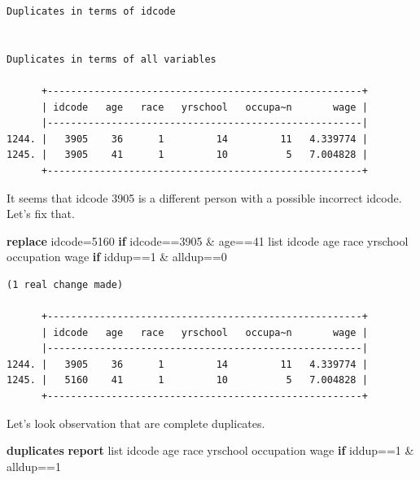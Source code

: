 \documentclass[
]{book}
\newenvironment{Shaded}{\begin{snugshade}}{\end{snugshade}}
\newcommand{\KeywordTok}[1]{\textcolor[rgb]{0.13,0.29,0.53}{\textbf{#1}}}
\newcommand{\NormalTok}[1]{#1}
\newcommand{\OtherTok}[1]{\textcolor[rgb]{0.56,0.35,0.01}{#1}}
\begin{document}
\begin{verbatim}
Duplicates in terms of idcode


Duplicates in terms of all variables

      +------------------------------------------------------+
      | idcode   age   race   yrschool   occupa~n       wage |
      |------------------------------------------------------|
1244. |   3905    36      1         14         11   4.339774 |
1245. |   3905    41      1         10          5   7.004828 |
      +------------------------------------------------------+
\end{verbatim}

It seems that idcode 3905 is a different person with a possible incorrect idcode. Let's fix that.

\begin{Shaded}
\begin{Highlighting}[]
\KeywordTok{replace}\NormalTok{ idcode=5160 }\KeywordTok{if}\NormalTok{ idcode==3905 \& age==41}
\OtherTok{list}\NormalTok{ idcode age race yrschool occupation wage }\KeywordTok{if}\NormalTok{ iddup==1 \& alldup==0}
\end{Highlighting}
\end{Shaded}

\begin{verbatim}
(1 real change made)

      +------------------------------------------------------+
      | idcode   age   race   yrschool   occupa~n       wage |
      |------------------------------------------------------|
1244. |   3905    36      1         14         11   4.339774 |
1245. |   5160    41      1         10          5   7.004828 |
      +------------------------------------------------------+
\end{verbatim}

Let's look observation that are complete duplicates.

\begin{Shaded}
\begin{Highlighting}[]
\KeywordTok{duplicates} \KeywordTok{report}
\OtherTok{list}\NormalTok{ idcode age race yrschool occupation wage }\KeywordTok{if}\NormalTok{ iddup==1 \& alldup==1}
\end{Highlighting}
\end{Shaded}
\end{document}
